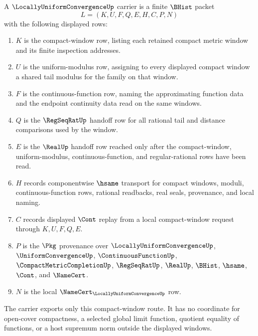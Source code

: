 \begin{definition}
\label{def:locally-uniform-convergence-carrier}
A $\LocallyUniformConvergenceUp$ carrier is a finite $\BHist$ packet
$$
L=(K,U,F,Q,E,H,C,P,N)
$$
with the following displayed rows:
\begin{enumerate}
\item $K$ is the compact-window row, listing each retained compact metric window and its finite inspection addresses.
\item $U$ is the uniform-modulus row, assigning to every displayed compact window a shared tail modulus for the family on that window.
\item $F$ is the continuous-function row, naming the approximating function data and the endpoint continuity data read on the same windows.
\item $Q$ is the $\RegSeqRatUp$ handoff row for all rational tail and distance comparisons used by the window.
\item $E$ is the $\RealUp$ handoff row reached only after the compact-window, uniform-modulus, continuous-function, and regular-rational rows have been read.
\item $H$ records componentwise $\hsame$ transport for compact windows, moduli, continuous-function rows, rational readbacks, real seals, provenance, and local naming.
\item $C$ records displayed $\Cont$ replay from a local compact-window request through $K,U,F,Q,E$.
\item $P$ is the $\Pkg$ provenance over $\LocallyUniformConvergenceUp$, $\UniformConvergenceUp$, $\ContinuousFunctionUp$, $\CompactMetricCompletionUp$, $\RegSeqRatUp$, $\RealUp$, $\BHist$, $\hsame$, $\Cont$, and $\NameCert$.
\item $N$ is the local $\NameCert_{\LocallyUniformConvergenceUp}$ row.
\end{enumerate}
The carrier exports only this compact-window route. It has no coordinate for open-cover compactness, a selected global limit function, quotient equality of functions, or a host supremum norm outside the displayed windows.
\end{definition}

